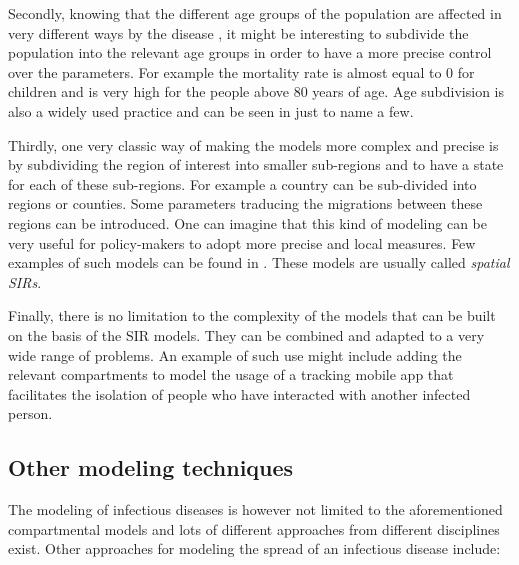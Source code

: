 \documentclass[12pt, letterpaper]{article}
\begin{document}
Secondly, knowing that the different age groups of the population are affected in very different ways by the disease \cite{agegroups}, it might be interesting to subdivide the population into the relevant age groups in order to have a more precise control over the parameters. 
For example the mortality rate is almost equal to 0 for children and is very high for the people above 80 years of age. 
Age subdivision is also a widely used practice and can be seen in \cite{age} just to name a few.

Thirdly, one very classic way of making the models more complex and precise is by subdividing the region of interest into smaller sub-regions and to have a state for each of these sub-regions. 
For example a country can be sub-divided into regions or counties. 
Some parameters traducing the migrations between these regions can be introduced. 
One can imagine that this kind of modeling can be very useful for policy-makers to adopt more precise and local measures. 
Few examples of such models can be found in \cite{spatial}. 
These models are usually called {\em spatial SIRs}. 

Finally, there is no limitation to the complexity of the models that can be built on the basis of the SIR models. 
They can be combined and adapted to a very wide range of problems. 
An example of such use might include adding the relevant compartments to model the usage of a tracking mobile app that facilitates the isolation of people who have interacted with another infected person.

\subsection{Other modeling techniques}

The modeling of infectious diseases is however not limited to the aforementioned compartmental models and lots of different approaches from different disciplines exist. 
Other approaches for modeling the spread of an infectious disease include:
\end{document}

